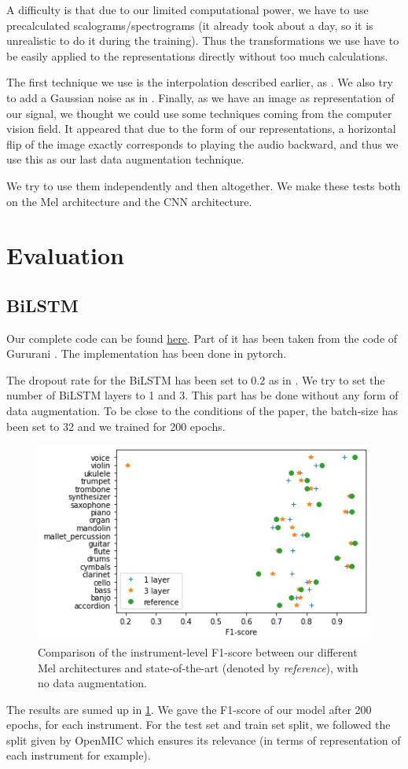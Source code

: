 \documentclass[final]{cvpr}
\begin{document}
A difficulty is that due to our limited computational power, we have to use precalculated scalograms/spectrograms (it already took about a day, so it is unrealistic to do it during the training). Thus the transformations we use have to be easily applied to the representations directly without too much calculations.

The first technique we use is the interpolation described earlier, as \cite{squelette_progr}. We also try to add a Gaussian noise as in \cite{data_aug}. Finally, as we have an image as representation of our signal, we thought we could use some techniques coming from the computer vision field. It appeared that due to the form of our representations, a horizontal flip of the image exactly corresponds to playing the audio backward, and thus we use this as our last data augmentation technique. 

We try to use them independently and then altogether. We make these tests both on the Mel architecture and the CNN architecture.
\section{Evaluation}
\subsection{BiLSTM}
Our complete code can be found \href{https://github.com/clementberger/Deep-Learning.git}{here}. Part of it has been taken from the code of Gururani \etal \cite{attention}. The implementation has been done in pytorch.

The dropout rate for the BiLSTM has been set to 0.2 as in \cite{squelette_progr}. We try to set the number of BiLSTM layers to 1 and 3. This part has be done without any form of data augmentation. To be close to the conditions of the paper, the batch-size has been set to 32 and we trained for 200 epochs.
\begin{figure}
	\centering
	\includegraphics[scale = 0.5]{to_ref.png}
	\caption{Comparison of the instrument-level F1-score between our different Mel architectures and state-of-the-art (denoted by \textit{reference}), with no data augmentation.}
	\label{to_ref}
\end{figure}
The results are sumed up in \ref{to_ref}. We gave the F1-score of our model after 200 epochs, for each instrument. For the test set and train set split, we followed the split given by OpenMIC which ensures its relevance (in terms of representation of each instrument for example).
\end{document}
